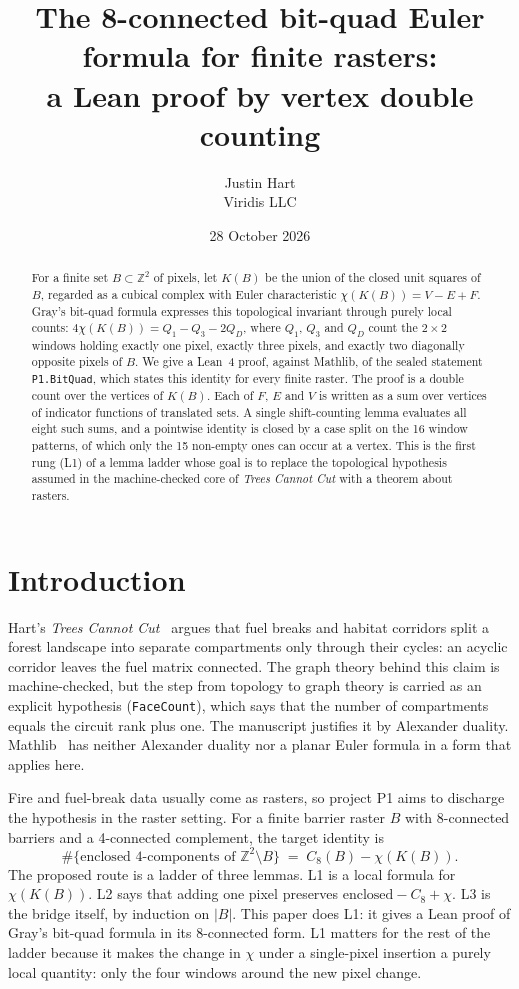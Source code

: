 \documentclass[11pt]{article}
\title{The 8-connected bit-quad Euler formula for finite rasters:\\
a Lean proof by vertex double counting}
\author{Justin Hart\\Viridis LLC}
\date{28 October 2026}
\theoremstyle{definition}
\theoremstyle{remark}
\begin{document}
\maketitle

\begin{abstract}
For a finite set $B\subset\mathbb{Z}^2$ of pixels, let $K(B)$ be the union of the
closed unit squares of $B$, regarded as a cubical complex with Euler
characteristic $\chi(K(B)) = V-E+F$. Gray's bit-quad formula expresses this
topological invariant through purely local counts:
$4\chi(K(B)) = Q_1 - Q_3 - 2Q_D$, where $Q_1$, $Q_3$ and $Q_D$ count the
$2\times2$ windows holding exactly one pixel, exactly three pixels, and exactly
two diagonally opposite pixels of $B$. We give a Lean~4 proof, against Mathlib,
of the sealed statement \texttt{P1.BitQuad}, which states this identity for every
finite raster. The proof is a double count over the vertices of $K(B)$. Each of
$F$, $E$ and $V$ is written as a sum over vertices of indicator functions of
translated sets. A single shift-counting lemma evaluates all eight such sums,
and a pointwise identity is closed by a case split on the 16 window patterns, of
which only the 15 non-empty ones can occur at a vertex. This is the first rung (L1) of a lemma ladder
whose goal is to replace the topological hypothesis assumed in the
machine-checked core of \emph{Trees Cannot Cut} with a theorem about rasters.
\end{abstract}

\section{Introduction}

Hart's \emph{Trees Cannot Cut}~\cite{Hart2026} argues that fuel breaks and
habitat corridors split a forest landscape into separate compartments only
through their cycles: an acyclic corridor leaves the fuel matrix connected. The
graph theory behind this claim is machine-checked, but the step from topology to
graph theory is carried as an explicit hypothesis (\texttt{FaceCount}), which
says that the number of compartments equals the circuit rank plus one. The
manuscript justifies it by Alexander duality. Mathlib~\cite{Mathlib2020} has
neither Alexander duality nor a planar Euler formula in a form that applies
here.

Fire and fuel-break data usually come as rasters, so project P1 aims to
discharge the hypothesis in the raster setting. For a finite barrier raster $B$
with 8-connected barriers and a 4-connected complement, the target identity is
\[
  \#\{\text{enclosed 4-components of } \mathbb{Z}^2\setminus B\}
  \;=\; C_8(B) - \chi(K(B)).
\]
The proposed route is a ladder of three lemmas. L1 is a local formula for
$\chi(K(B))$. L2 says that adding one pixel preserves
$\text{enclosed} - C_8 + \chi$. L3 is the bridge itself, by induction on $|B|$.
This paper does L1: it gives a Lean proof of Gray's bit-quad formula in its
8-connected form. L1 matters for the rest of the ladder because it makes the
change in $\chi$ under a single-pixel insertion a purely local quantity: only
the four windows around the new pixel change.
\end{document}
